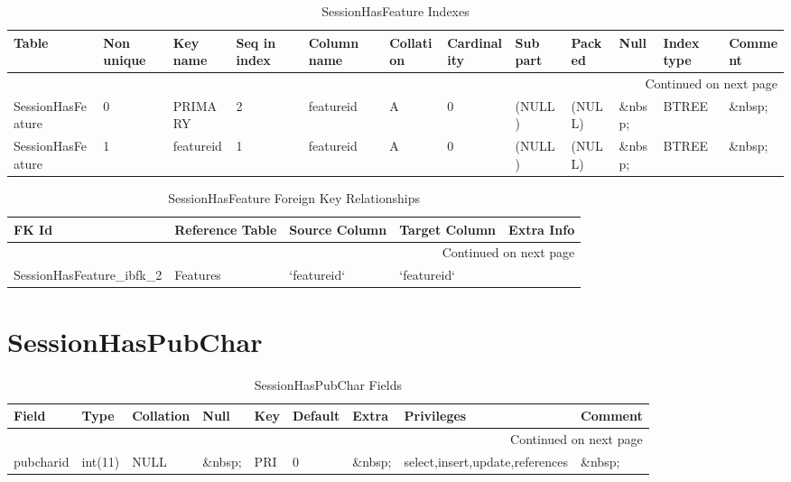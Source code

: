 \documentclass[tablesignature]{scrartcl}
\begin{document}
\begin{longtable}{|l|l|l|l|l|l|l|l|l|l|l|l|}
\caption{SessionHasFeature Indexes} \label{tbl:sessionhasfeatureindexes}\\
\hline
 Table              &  Non unique  &  Key name   &  Seq in index  &  Column name  &  Collation  &  Cardinality  &  Sub part  &  Packed  &  Null     &  Index type  &  Comment \\
\hline
\endhead
\hline\multicolumn{12}{r}{Continued on next page}\
\endfoot
\endlastfoot
\hline
 SessionHasFeature  &           0  &  PRIMARY    &             1  &  sessionid    &  A          &            0  &  (NULL)    &  (NULL)  &  \&nbsp;  &  BTREE       &  \&nbsp;  \\
 SessionHasFeature  &           0  &  PRIMARY    &             2  &  featureid    &  A          &            0  &  (NULL)    &  (NULL)  &  \&nbsp;  &  BTREE       &  \&nbsp;  \\
 SessionHasFeature  &           1  &  featureid  &             1  &  featureid    &  A          &            0  &  (NULL)    &  (NULL)  &  \&nbsp;  &  BTREE       &  \&nbsp;  \\
\hline
\end{longtable}


\begin{longtable}{|l|l|l|l|l|}
\caption{SessionHasFeature Foreign Key Relationships} \label{tbl:sessionhasfeaturefkr}\\
\hline
 FK Id                           &  Reference Table  &  Source Column  &  Target Column  &  Extra Info \\
\hline
\endhead
\hline\multicolumn{5}{r}{Continued on next page}\
\endfoot
\endlastfoot
\hline
 SessionHasFeature\_{}ibfk\_{}1  &  Sessions         &  `sessionid`    &  `sessionid`    &              \\
 SessionHasFeature\_{}ibfk\_{}2  &  Features         &  `featureid`    &  `featureid`    &              \\
\hline
\end{longtable}
\section{SessionHasPubChar}
\label{sec-27}


\begin{longtable}{|l|l|l|l|l|l|l|l|l|}
\caption{SessionHasPubChar Fields} \label{tbl:sessionhaspubcharfields}\\
\hline
 Field      &  Type     &  Collation  &  Null     &  Key  &  Default  &  Extra    &  Privileges                       &  Comment \\
\hline
\endhead
\hline\multicolumn{9}{r}{Continued on next page}\
\endfoot
\endlastfoot
\hline
 sessionid  &  int(11)  &  NULL       &  \&nbsp;  &  PRI  &        0  &  \&nbsp;  &  select,insert,update,references  &  \&nbsp;  \\
 pubcharid  &  int(11)  &  NULL       &  \&nbsp;  &  PRI  &        0  &  \&nbsp;  &  select,insert,update,references  &  \&nbsp;  \\
\hline
\end{longtable}
\end{document}
